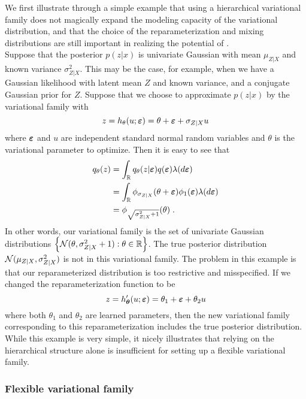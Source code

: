 \documentclass[10pt]{article}
\begin{document}
We first illustrate through a simple example that using a hierarchical variational family does not magically expand the modeling capacity of the variational distribution, and that the choice of the reparameterization and mixing distributions are still important in realizing the potential of \uivi.
\\

Suppose that the posterior $p(z|x)$ is univariate Gaussian with mean $\mu_{Z|X}$ and known variance $\sigma_{Z|X}^2$. This may be the case, for example, when we have a Gaussian likelihood with latent mean $Z$ and known variance, and a conjugate Gaussian prior for $Z$. Suppose that we choose to approximate $p(z|x)$ by the \uivi variational family with
\[
z = h_\theta(u;\bm{\varepsilon}) = \theta + \bm{\varepsilon} + \sigma_{Z|X}u
\]
where $\bm{\varepsilon}$ and $u$ are independent standard normal random variables and $\theta$ is the variational parameter to optimize. Then it is easy to see that
\begin{align*}
q_\theta(z) &= \int_{\mathbb{R}} q_\theta(z|\bm{\varepsilon})q(\bm{\varepsilon})\lambda(d\bm{\varepsilon}) \\
&= \int_{\mathbb{R}} \phi_{\sigma_{Z|X}}(\theta+\bm{\varepsilon})\phi_1(\bm{\varepsilon}) \lambda(d\bm{\varepsilon}) \\
&= \phi_{\sqrt{\sigma_{Z|X}^2+1}}(\theta) \;.
\end{align*}
In other words, our variational family is the set of univariate Gaussian distributions $\left\{\mathcal{N}(\theta,\sigma_{Z|X}^2+1):\theta\in\mathbb{R}\right\}$. The true posterior distribution $\mathcal{N}(\mu_{Z|X},\sigma_{Z|X}^2)$ is not in this variational family. The problem in this example is that our reparameterized distribution is too restrictive and misspecified. If we changed the reparameterization function to be
\[
z = h_{\bm{\theta}}'(u;\bm{\varepsilon}) = \theta_1 + \bm{\varepsilon} + \theta_2u
\]
where both $\theta_1$ and $\theta_2$ are learned parameters, then the new variational family corresponding to this reparameterization includes the true posterior distribution. While this example is very simple, it nicely illustrates that relying on the hierarchical structure alone is insufficient for setting up a flexible variational family.


\subsubsection{Flexible variational family}
\end{document}
